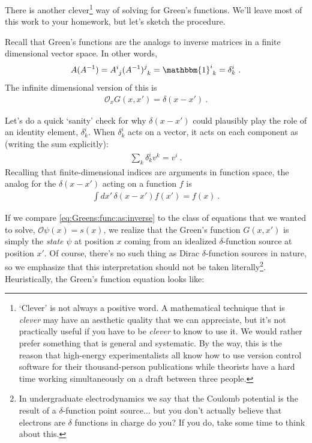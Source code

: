 There is another clever\footnote{`Clever' is not always a positive word. A mathematical technique that is \emph{clever} may have an aesthetic quality that we can appreciate, but it's not practically useful if you have to be \emph{clever} to know to use it. We would rather prefer something that is general and systematic. By the way, this is the reason that high-energy experimentalists all know how to use version control software for their thousand-person publications while theorists have a hard time working simultaneously on a draft between three people.} way of solving for Green's functions. We'll leave most of this work to your homework, but let's sketch the procedure. 

Recall that Green's functions are the analogs to inverse matrices in a finite dimensional vector space. In other words, 
\begin{align}
  A(A^{-1}) = \mat{A}{i}{j}\mat{(A^{-1})}{j}{k} = \mat{\mathbbm{1}}{i}{k} = \delta^i_k \ .
\end{align}
The infinite dimensional version of this is
\begin{align}
  \mathcal O_x G(x,x') = \delta(x-x') \ .
  \label{eq:Greens:func:as:inverse}
\end{align}
\begin{example}
Let's do a quick `sanity' check for why $\delta(x-x')$ could plausibly play the role of an identity element, $\delta^i_k$. When $\delta^i_k$ acts on a vector, it acts on each component as (writing the sum explicitly):
\begin{align}
  \sum_k \delta^i_k v^k = v^i \ .
\end{align}
Recalling that finite-dimensional indices are arguments in function space, the analog for the $\delta(x-x')$ acting on a function $f$ is
\begin{align}
  \int dx' \, \delta(x-x') f(x') = f(x) \ .
\end{align}
\end{example}
If we compare \eqref{eq:Greens:func:as:inverse} to the class of equations that we wanted to solve, $\mathcal O \psi(x) = s(x)$, we realize that the Green's function $G(x,x')$ is simply the \emph{state} $\psi$  at position $x$ coming from an idealized $\delta$-function source at position $x'$. Of course, there's no such thing as Dirac $\delta$-function sources in nature, so we emphasize that this interpretation should not be taken literally\footnote{In undergraduate electrodynamics we say that the Coulomb potential is the result of a $\delta$-function point source... but you don't actually believe that electrons are $\delta$ functions in charge do you? If you do, take some time to think about this.}.  Heuristically, the Green's function equation looks like:
